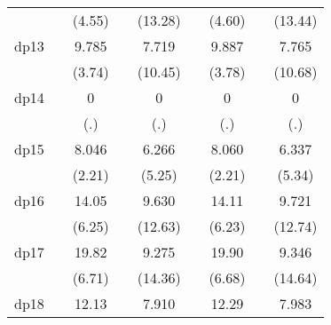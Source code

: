 {\begin{tabular}{l*{8}{c}}
            &                     &      (4.55)         &                     &     (13.28)         &                     &      (4.60)         &                     &     (13.44)         \\
[1em]
dp13        &                     &       9.785\sym{***}&                     &       7.719\sym{***}&                     &       9.887\sym{***}&                     &       7.765\sym{***}\\
            &                     &      (3.74)         &                     &     (10.45)         &                     &      (3.78)         &                     &     (10.68)         \\
[1em]
dp14        &                     &           0         &                     &           0         &                     &           0         &                     &           0         \\
            &                     &         (.)         &                     &         (.)         &                     &         (.)         &                     &         (.)         \\
[1em]
dp15        &                     &       8.046\sym{*}  &                     &       6.266\sym{***}&                     &       8.060\sym{*}  &                     &       6.337\sym{***}\\
            &                     &      (2.21)         &                     &      (5.25)         &                     &      (2.21)         &                     &      (5.34)         \\
[1em]
dp16        &                     &       14.05\sym{***}&                     &       9.630\sym{***}&                     &       14.11\sym{***}&                     &       9.721\sym{***}\\
            &                     &      (6.25)         &                     &     (12.63)         &                     &      (6.23)         &                     &     (12.74)         \\
[1em]
dp17        &                     &       19.82\sym{***}&                     &       9.275\sym{***}&                     &       19.90\sym{***}&                     &       9.346\sym{***}\\
            &                     &      (6.71)         &                     &     (14.36)         &                     &      (6.68)         &                     &     (14.64)         \\
[1em]
dp18        &                     &       12.13\sym{***}&                     &       7.910\sym{***}&                     &       12.29\sym{***}&                     &       7.983\sym{***}\\

\end{tabular}}

